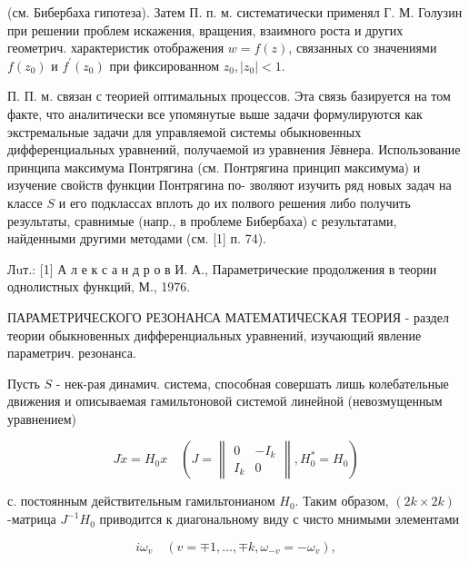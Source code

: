 \documentclass[10pt]{article}
\begin{document}
(см. Бибербаха гипотеза). Затем П. п. м. систематически применял Г. М. Голузин при решении проблем искажения, вращения, взаимного роста и других геометрич. характеристик отображения $w=f(z)$, связанных со значениями $f\left(z_{0}\right)$ и $f^{\prime}\left(z_{0}\right)$ при фиксированном $z_{0},\left|z_{0}\right|<1$.



П. П. м. связан с теорией оптимальных процессов. Эта связь базируется на том факте, что аналитически все упомянутые выше задачи формулируются как экстремальные задачи для управляемой системы обыкновенных дифференциальных уравнений, получаемой из уравнения Јёвнера. Использование принципа максимума Понтрягина (см. Понтрягина принцип максимума) и изучение свойств функции Понтрягина по- зволяют изучить ряд новых задач на классе $S$ и его подклассах вплоть до их полвого решения либо получить результаты, сравнимые (напр., в проблеме Бибербаха) с результатами, найденными другими методами (см. [1] п. 74).



Лuт.: [1] А л е к с а н д р о в И. А., Параметрические продолжения в теории однолистных функций, М., 1976.



ПАРАМЕТРИЧЕСКОГО РЕЗОНАНСА МАТЕМАТИЧЕСКАЯ ТЕОРИЯ - раздел теории обыкновенных дифференциальных уравнений, изучающий явление параметрич. резонанса.



Пусть $S$ - нек-рая динамич. система, способная совершать лишь колебательные движения и описываемая гамильтоновой системой линейной (невозмущенным уравнением)



\[

J \dot{x}=H_{0} x \quad\left(J=\left\|\begin{array}{cc}

0 & -I_{k} \\

I_{k} & 0

\end{array}\right\|, H_{0}^{*}=H_{0}\right)

\]



с. постоянным действительным гамильтонианом $H_{0}$. Таким образом, $(2 k \times 2 k)$-матрица $J^{-1} H_{0}$ приводится к диагональному виду с чисто мнимыми элементами



\[

i \omega_{v} \quad\left(v=\mp 1, \ldots, \mp k, \omega_{-v}=-\omega_{v}\right),

\]
\end{document}
